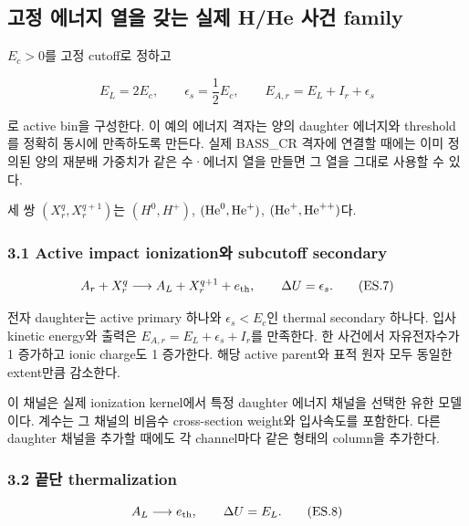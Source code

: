 \hypertarget{uxace0uxc815-uxc5d0uxb108uxc9c0-uxc5f4uxc744-uxac16uxb294-uxc2e4uxc81c-hhe-uxc0acuxac74-family}{%
\subsection{고정 에너지 열을 갖는 실제 H/He 사건 family}\label{uxace0uxc815-uxc5d0uxb108uxc9c0-uxc5f4uxc744-uxac16uxb294-uxc2e4uxc81c-hhe-uxc0acuxac74-family}}

\(E_c>0\)를 고정 cutoff로 정하고

\[
E_L=2E_c,\qquad \epsilon_s=\frac12E_c,\qquad
E_{A,r}=E_L+I_r+\epsilon_s
\tag{ES.6}
\]

로 active bin을 구성한다. 이 예의 에너지 격자는 양의 daughter 에너지와 threshold를 정확히 동시에 만족하도록 만든다. 실제 BASS\_CR 격자에 연결할 때에는 이미 정의된 양의 재분배 가중치가 같은 수·에너지 열을 만들면 그 열을 그대로 사용할 수 있다.

세 쌍 \((X_r^q,X_r^{q+1})\)는 \((H^0,H^+)\), \(({\rm He}^0,{\rm He}^+)\), \(({\rm He}^+,{\rm He}^{++})\)다.

\hypertarget{active-impact-ionizationuxc640-subcutoff-secondary}{%
\subsubsection{3.1 Active impact ionization와 subcutoff secondary}\label{active-impact-ionizationuxc640-subcutoff-secondary}}

\[
A_r+X_r^q\longrightarrow A_L+X_r^{q+1}+e_{\rm th},
\qquad \Delta U=\epsilon_s.
\tag{ES.7}
\]

전자 daughter는 active primary 하나와 \(\epsilon_s<E_c\)인 thermal secondary 하나다. 입사 kinetic energy와 출력은 \(E_{A,r}=E_L+\epsilon_s+I_r\)를 만족한다. 한 사건에서 자유전자수가 1 증가하고 ionic charge도 1 증가한다. 해당 active parent와 표적 원자 모두 동일한 extent만큼 감소한다.

이 채널은 실제 ionization kernel에서 특정 daughter 에너지 채널을 선택한 유한 모델이다. 계수는 그 채널의 비음수 cross-section weight와 입사속도를 포함한다. 다른 daughter 채널을 추가할 때에도 각 channel마다 같은 형태의 column을 추가한다.

\hypertarget{uxb05duxb2e8-thermalization}{%
\subsubsection{3.2 끝단 thermalization}\label{uxb05duxb2e8-thermalization}}

\[
A_L\longrightarrow e_{\rm th},
\qquad \Delta U=E_L.
\tag{ES.8}
\]

